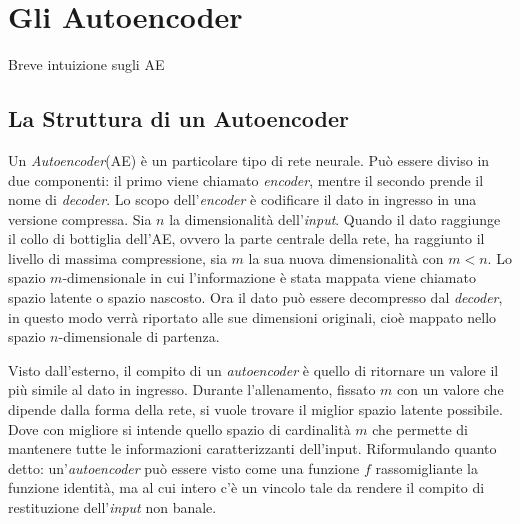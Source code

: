 
%
%



\chapter{Gli Autoencoder}

Breve intuizione sugli AE

\section{La Struttura di un Autoencoder}
Un \textit{Autoencoder}(AE) è un particolare tipo di rete neurale.
Può essere diviso in due componenti: il primo viene chiamato \textit{encoder}, mentre il secondo prende il nome di \textit{decoder}.
Lo scopo dell'\textit{encoder} è codificare il dato in ingresso in una versione compressa.
Sia $n$ la dimensionalità dell'\textit{input}.
Quando il dato raggiunge il collo di bottiglia dell'AE, ovvero la parte centrale della rete, ha raggiunto il livello di massima compressione, sia $m$ la sua nuova dimensionalità con $m<n$.
Lo spazio $m$-dimensionale in cui l'informazione è stata mappata viene chiamato spazio latente o spazio nascosto.
Ora il dato può essere decompresso dal \textit{decoder}, in questo modo verrà riportato alle sue dimensioni originali, cioè mappato nello spazio $n$-dimensionale di partenza.

Visto dall'esterno, il compito di un \textit{autoencoder} è quello di ritornare un valore il più simile al dato in ingresso.
Durante l'allenamento, fissato $m$ con un valore che dipende dalla forma della rete, si vuole trovare il miglior spazio latente possibile.
Dove con migliore si intende quello spazio di cardinalità $m$ che permette di mantenere tutte le informazioni caratterizzanti dell'input.
Riformulando quanto detto: un'\textit{autoencoder} può essere visto come una funzione $f$ rassomigliante la funzione identità, ma al cui intero c'è un vincolo tale da rendere il compito di restituzione dell'\textit{input} non banale.

